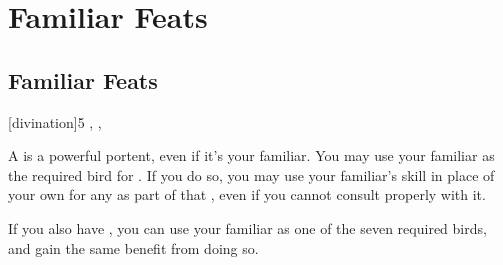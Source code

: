 \chapter{Familiar Feats}

\section{Familiar Feats}

[divination]{5}{
	,
	,
}{
	A  is a powerful portent, even if it's your familiar.
	You may use your familiar as the required bird for .
	If you do so, you may use your familiar's  skill in place of your own for any {\tests} as part of that , even if you cannot consult properly with it.
	
	If you also have , you can use your familiar as one of the seven required birds, and gain the same benefit from doing so.
}

